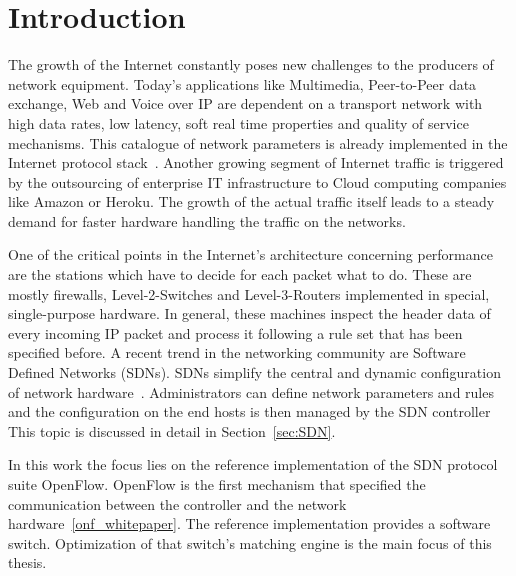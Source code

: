 \documentclass[a4paper,
		12pt,
		parskip=full,
		titlepage
		]{scrartcl}
\begin{document}


\setcounter{page}{1}
\tableofcontents{}

\pagebreak

\pagestyle{scrheadings}

\section{Introduction}
The growth of the Internet constantly poses new challenges to the producers of network equipment.
Today's applications like Multimedia, Peer-to-Peer data exchange, Web and Voice over IP are dependent on a transport network with
high data rates, low latency, soft real time properties and quality of service mechanisms.
This catalogue of network parameters is already implemented in the Internet protocol stack~\cite{rfc3260, rfc3261, rfc5694, rfc3550}.
Another growing segment of Internet traffic is triggered by the outsourcing of 
enterprise IT infrastructure to Cloud computing companies like Amazon or Heroku.
The growth of the actual traffic itself leads to a steady demand for faster hardware handling the traffic on the networks.

One of the critical points in the Internet's architecture concerning performance 
are the stations which have to decide for each packet what to do.
These are mostly firewalls, Level-2-Switches and Level-3-Routers implemented in special, single-purpose hardware.
In general, these machines inspect the header data of every incoming IP packet and process it 
following a rule set that has been specified before.
A recent trend in the networking community are Software Defined Networks (SDNs).
SDNs simplify the central and dynamic configuration of network hardware~\cite{onf_whitepaper}.
Administrators can define network parameters and rules and the configuration on the end hosts is then managed by the SDN controller
This topic is discussed in detail in Section~\ref{sec:SDN}.

In this work the focus lies on the reference implementation of the SDN protocol suite OpenFlow.
OpenFlow is the first mechanism that specified the communication between the controller and the network hardware~\ref{onf_whitepaper}.
The reference implementation provides a software switch.
Optimization of that switch's matching engine is the main focus of this thesis.
\end{document}
